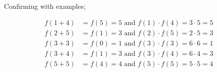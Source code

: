 \documentclass[12pt]{article}
\begin{document}
Confirming with examples;

$$
\begin{aligned}
	f(1+4)&=f(5)=5 \text{ and } f(1) \cdot f(4)=3\cdot5=5 \\
	f(2+5)&=f(1)=3 \text{ and } f(2) \cdot f(5)=2\cdot5=3 \\
	f(3+3)&=f(0)=1 \text{ and } f(3) \cdot f(3)=6\cdot6=1 \\
	f(3+4)&=f(1)=3 \text{ and } f(3) \cdot f(4)=6\cdot4=3 \\
	f(5+5)&=f(4)=4 \text{ and } f(5) \cdot f(5)=5\cdot5=4 \\
\end{aligned}
$$
	
\end{document}
